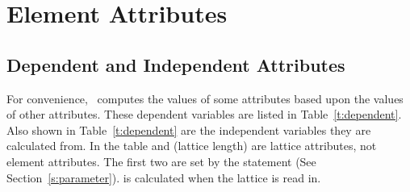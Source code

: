 \chapter {Element Attributes}
\label{c:attrib}

\section{Dependent and Independent Attributes} 
\label{s:depend} 

For convenience, \bmad\ computes the values of some attributes based
upon the values of other attributes. These dependent variables are
listed in Table~\ref{t:dependent}. Also shown in
Table~\ref{t:dependent} are the independent variables they are
calculated from.  In the table  and  (lattice
length) are lattice attributes, not element attributes. The first two
are set by the  statement (See
Section~\ref{s:parameter}).  is calculated when the
lattice is read in.

\begin{table}[h]
\caption[Table of dependent variables.]{Table of dependent variables and 
  the independent variables 
they are calculated from.}
\label{t:dependent}
\end{table}

